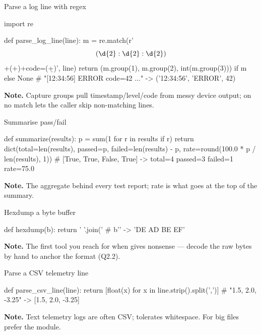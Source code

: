 \begin{gymproblem}{Parse a log line with regex}
\begin{pygym}
import re

def parse_log_line(line):
    m = re.match(r'\[(\d{2}:\d{2}:\d{2})\]\s+(\w+)\s+code=(\d+)', line)
    return (m.group(1), m.group(2), int(m.group(3))) if m else None
# "[12:34:56] ERROR code=42 ..." -> ('12:34:56', 'ERROR', 42)
\end{pygym}
\textbf{Note.} Capture groups pull timestamp/level/code from messy device output;
 on no match lets the caller skip non-matching lines.
\end{gymproblem}

\begin{gymproblem}{Summarise pass/fail}
\begin{pygym}
def summarize(results):
    p = sum(1 for r in results if r)
    return dict(total=len(results), passed=p, failed=len(results) - p,
                rate=round(100.0 * p / len(results), 1))
# [True, True, False, True] -> total=4 passed=3 failed=1 rate=75.0
\end{pygym}
\textbf{Note.} The aggregate behind every test report; rate is what goes at the
top of the summary.
\end{gymproblem}

\begin{gymproblem}{Hexdump a byte buffer}
\begin{pygym}
def hexdump(b):
    return ' '.join('%
# b'\xDE\xAD\xBE\xEF' -> 'DE AD BE EF'
\end{pygym}
\textbf{Note.} The first tool you reach for when  gives nonsense ---
decode the raw bytes by hand to anchor the format (Q2.2).
\end{gymproblem}

\begin{gymproblem}{Parse a CSV telemetry line}
\begin{pygym}
def parse_csv_line(line):
    return [float(x) for x in line.strip().split(',')]
# "1.5, 2.0, -3.25" -> [1.5, 2.0, -3.25]
\end{pygym}
\textbf{Note.} Text telemetry logs are often CSV;  tolerates
whitespace. For big files prefer the  module.
\end{gymproblem}

